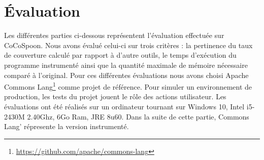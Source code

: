 \chapter{Évaluation}
	\thispagestyle{document}

Les différentes parties ci-dessous représentent l'évaluation effectuée sur CoCoSpoon. Nous avons évalué celui-ci sur trois critères : la pertinence du taux de couverture calculé par rapport à d'autre outils, le temps d'exécution du programme instrumenté ainsi que la quantité maximale de mémoire nécessaire comparé à l'original. Pour ces différentes évaluations nous avons choisi Apache Commons Lang\footnote{\url{https://github.com/apache/commons-lang}} comme projet de référence. Pour simuler un environnement de production, les tests du projet jouent le rôle des actions utilisateur. Les évaluations ont été réalisés sur un ordinateur tournant sur Windows 10, Intel i5-2430M 2.40Ghz, 6Go Ram, JRE 8u60. Dans la suite de cette partie, Commons Lang' répresente la version instrumenté.
	
		
		
		
		